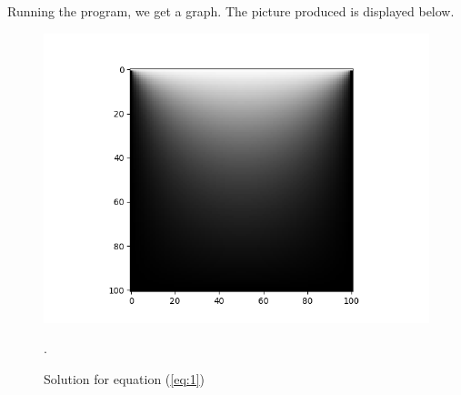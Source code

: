   Running the program, we get a graph. The picture produced is displayed below.

  \begin{figure}[h]
    \center
    \includegraphics[scale = .8]{../Figure1.png}
    \caption{Solution for equation (\ref{eq:1})}.
  \end{figure}


